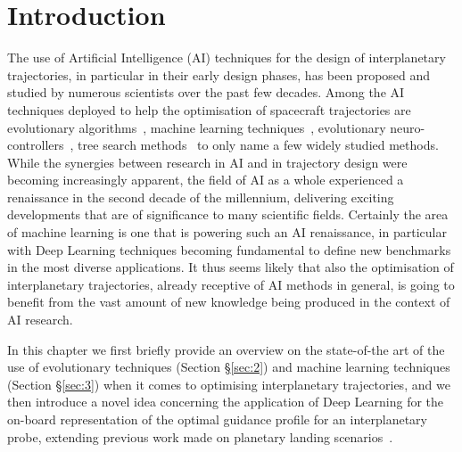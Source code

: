\documentclass[graybox]{svmult}
\begin{document}
\section{Introduction}
\label{sec:1}
The use of Artificial Intelligence (AI) techniques for the design of interplanetary trajectories, in particular in their early design phases, has been proposed and studied by numerous scientists over the past few decades. Among the AI techniques deployed to help the optimisation of spacecraft trajectories are evolutionary algorithms~\cite{janin1985genetic,gage1995interplanetary, izzo2007search, lee2005multi, sentinella2009hybrid, vasile2010analysis, olds2007interplanetary, izzo2013search}, machine learning techniques~\cite{ampatzis2009machine, cassioli2012machine, mereta2017machine, izzo2016designing}, evolutionary neuro-controllers~\cite{dachwald2004low, bernd:2018}, tree search methods~\cite{grigoriev2013choosing, hennes2015interplanetary, simoes2017multi, izzo2016designing, izzo2013search} to only name a few widely studied methods. While the synergies between research in AI and in trajectory design were becoming increasingly apparent, the field of AI as a whole experienced a renaissance in the second decade of the millennium, delivering exciting developments that are of significance to many scientific fields. Certainly the area of machine learning is one that is powering such an AI renaissance, in particular with Deep Learning techniques \cite{schmidhuber2015deep} becoming fundamental to define new benchmarks in the most diverse applications. It thus seems likely that also the optimisation of interplanetary trajectories, already receptive of AI methods in general, is going to benefit from the vast amount of new knowledge being produced in the context of AI research. 

In this chapter we first briefly provide an overview on the state-of-the art of the use of evolutionary techniques (Section \S \ref{sec:2}) and machine learning techniques (Section \S \ref{sec:3}) when it comes to optimising interplanetary trajectories, and we then introduce a novel idea concerning the application of Deep Learning for the on-board representation of the optimal guidance profile for an interplanetary probe, extending previous work made on planetary landing scenarios~\cite{sanchez2016learning, sanchez2016real, schiavone2012autonomous}.
\end{document}

